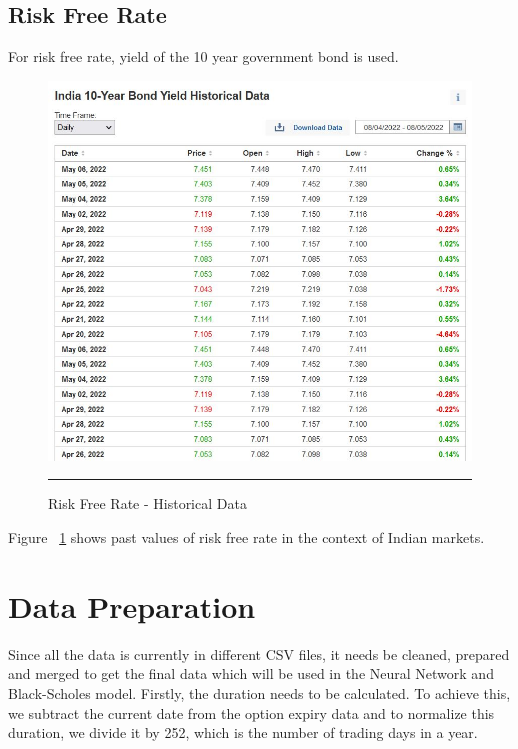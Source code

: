 \subsection{Risk Free Rate}

For risk free rate, yield of the 10 year government bond is used.   

\begin{figure}[htbp]
  \centering
    \includegraphics[scale=0.35]{Figures/data_collec_risk_rate.JPG}
    \rule{35em}{0.5pt}
  \caption[Risk Free Rate]{Risk Free Rate - Historical Data}
  \label{fig:data_collec_risk_rate}
\end{figure}

Figure ~\ref{fig:data_collec_risk_rate} shows past values of risk free rate in the context of Indian markets.

\section{Data Preparation}

Since all the data is currently in different CSV files, it needs be cleaned, prepared and merged to get the final data which will be used in the Neural Network and Black-Scholes model. Firstly, the duration needs to be calculated. To achieve this, we subtract the current date from the option expiry data and to normalize this duration, we divide it by 252, which is the number of trading days in a year. 

